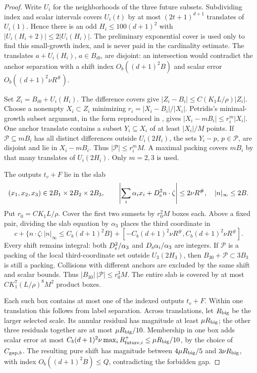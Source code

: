 \begin{proof}
Write \(U_i\) for the neighborhoods of the three future subsets.
Subdividing index and scalar intervals covers \(U_i(t)\) by at
most \((2t+1)^{d+1}\) translates of \(U_i(1)\).  Hence there is
an odd \(H_i\le100(d+1)^2\) with
\(|U_i(H_i+2)|\le2|U_i(H_i)|\).  The preliminary exponential
cover is used only to find this small-growth index, and is never
paid in the cardinality estimate.  The translates
\(a+U_i(H_i)\), \(a\in B_{i0}\), are disjoint: an intersection
would contradict the anchor separation with a shift index
\(O_b((d+1)^2B)\) and scalar error
\(O_b((d+1)^2\nu R^\#)\).

Set \(Z_i=B_{i0}+U_i(H_i)\).  The difference covers give
\( |Z_i-B_i|\le C(K_1L/\rho)|Z_i|\).
Choose a nonempty \(X_i\subset Z_i\) minimizing
\(r_i=|X_i-B_i|/|X_i|\).  Petridis's minimal-growth subset
argument, in the form reproduced in \cite[Lemma~9.1]{H}, gives
\( |X_i-mB_i|\le r_i^m|X_i|\).
One anchor translate contains a subset \(Y_i\subseteq X_i\)
of at least \(|X_i|/M\) points.  If \(\mathcal P\subseteq mB_i\)
has all distinct differences outside \(U_i(2H_i)\), the sets
\(Y_i-p\), \(p\in\mathcal P\), are disjoint and lie in
\(X_i-mB_i\).  Thus \(|\mathcal P|\le r_i^mM\).
A maximal packing covers \(mB_i\) by that
many translates of \(U_i(2H_i)\).  Only \(m=2,3\) is used.

The outputs \(t_v+F\) lie in the slab
\[
 (x_1,x_2,x_3)\in2B_1\times2B_2\times2B_3,\qquad
 \left|\sum_i\alpha_ix_i+D_{\rm s}^2n\cdot\zeta\right|
                  \le2\nu R^\#,\quad |n|_\infty\le2B.
\]
Put \(r_0=CK_1L/\rho\).  Cover the first two sumsets by
\(r_0^2M\) boxes each.  Above a fixed pair, dividing the slab
equation by \(\alpha_3\) places the third coordinate in
\[
 c+\{n\cdot\zeta:|n|_\infty\le C_b(d+1)^2B\}
       +[-C_b(d+1)^2\nu R^\#,C_b(d+1)^2\nu R^\#].
\]
Every shift remains integral: both \(D_{\rm s}^2/\alpha_3\)
and \(D_{\rm s}\alpha_i/\alpha_3\) are integers.
If \(\mathcal P\) is a packing of the local third-coordinate
set outside \(U_3(2H_3)\), then
\(B_{30}+\mathcal P\subset3B_3\) is still a packing.
Collisions with different anchors are excluded by the same shift
and scalar bounds.  Thus
\( |B_{30}|\,|\mathcal P|\le r_0^3M\).
The entire slab is covered by at most
\(CK_1^7(L/\rho)^8M^2\) product boxes.

Each such box contains at most one of the indexed outputs
\(t_v+F\).  Within one translation this follows from label
separation.  Across translations, let \(R_{\rm big}\) be the
larger selected scale.  Its annular residual has magnitude at
least \(\mu R_{\rm big}\); the other three residuals together
are at most \(\mu R_{\rm big}/10\).  Membership in one box
adds scalar error at most
\(C_b(d+1)^2\nu\max_i R_{{\rm future},i}^+
\le\mu R_{\rm big}/10\), by the choice of \(C_{{\rm gap},b}\).
The resulting pure shift has magnitude between
\(4\mu R_{\rm big}/5\) and \(3\nu R_{\rm big}\), with index
\(O_b((d+1)^2B)\le Q\), contradicting the forbidden gap.


\end{proof}
